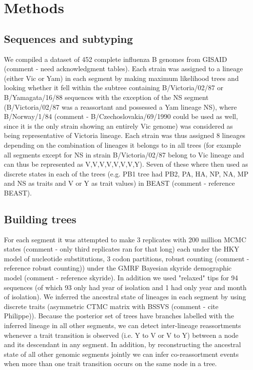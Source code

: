 \documentclass[11pt,oneside,letterpaper]{article}
\begin{document}
\section*{Methods}

\subsection*{Sequences and subtyping}
We compiled a dataset of 452 complete influenza B genomes from GISAID (comment - need acknowledgment tables). 
Each strain was assigned to a lineage (either Vic or Yam) in each segment by making maximum likelihood trees and looking whether it fell within the subtree containing B/Victoria/02/87 or B/Yamagata/16/88 sequences with the exception of the NS segment (B/Victoria/02/87 was a reassortant and possessed a Yam lineage NS), where B/Norway/1/84 (comment - B/Czechoslovakia/69/1990 could be used as well, since it is the only strain showing an entirely Vic genome) was considered as being representative of Victoria lineage.
Each strain was thus assigned 8 lineages depending on the combination of lineages it belongs to in all trees (for example all segments except for NS in strain B/Victoria/02/87 belong to Vic lineage and can thus be represented as V,V,V,V,V,V,V,Y). 
Seven of these where then used as discrete states in each of the trees (e.g. PB1 tree had PB2, PA, HA, NP, NA, MP and NS as traits and V or Y as trait values) in BEAST (comment - reference BEAST).

\subsection*{Building trees}
For each segment it was attempted to make 3 replicates with 200 million MCMC states (comment - only third replicates ran for that long) each under the HKY model of nucleotide substitutions, 3 codon partitions, robust counting (comment - reference robust counting)) under the GMRF Bayesian skyride demographic model (comment - reference skyride).
In addition we used "relaxed" tips for 94 sequences (of which 93 only had year of isolation and 1 had only year and month of isolation).
We inferred the ancestral state of lineages in each segment by using discrete traits (asymmetric CTMC matrix with BSSVS (comment - cite Philippe)). Because the posterior set of trees have branches labelled with the inferred lineage in all other segments, we can detect inter-lineage reassortments whenever a trait transition is observed (i.e. Y to V or V to Y) between a node and its descendant in any segment. 
In addition, by reconstructing the ancestral state of all other genomic segments jointly we can infer co-reassortment events when more than one trait transition occurs on the same node in a tree.
\end{document}
